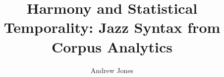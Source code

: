 \documentclass[12pt,titlepage]{report}
\begin{document}
\author{Andrew Jones}
\title{Harmony and Statistical Temporality: Jazz Syntax from Corpus Analytics}
\maketitle
%
\setcounter{page}{1}
\tableofcontents
\newpage
\listoffigures
\newpage
%
\setcounter{page}{1}
%
%
\end{document}
